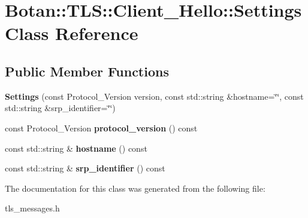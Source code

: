 \hypertarget{class_botan_1_1_t_l_s_1_1_client___hello_1_1_settings}{}\section{Botan\+:\+:T\+LS\+:\+:Client\+\_\+\+Hello\+:\+:Settings Class Reference}
\label{class_botan_1_1_t_l_s_1_1_client___hello_1_1_settings}
\subsection*{Public Member Functions}
\begin{DoxyCompactItemize}
\item 
\mbox{\label{class_botan_1_1_t_l_s_1_1_client___hello_1_1_settings_a61bdfb25a92edd0d0a24cb6f07dc519c}} 
{\bfseries Settings} (const Protocol\+\_\+\+Version version, const std\+::string \&hostname=\char`\"{}\char`\"{}, const std\+::string \&srp\+\_\+identifier=\char`\"{}\char`\"{})
\item 
\mbox{\label{class_botan_1_1_t_l_s_1_1_client___hello_1_1_settings_a832473d40546c2285cedcc82e014e822}} 
const Protocol\+\_\+\+Version {\bfseries protocol\+\_\+version} () const
\item 
\mbox{\label{class_botan_1_1_t_l_s_1_1_client___hello_1_1_settings_a6925918be4aed0beb65b681a246445d2}} 
const std\+::string \& {\bfseries hostname} () const
\item 
\mbox{\label{class_botan_1_1_t_l_s_1_1_client___hello_1_1_settings_a98c90321ba8f044adf9f321364fa6165}} 
const std\+::string \& {\bfseries srp\+\_\+identifier} () const
\end{DoxyCompactItemize}


The documentation for this class was generated from the following file\+:\begin{DoxyCompactItemize}
\item 
tls\+\_\+messages.\+h\end{DoxyCompactItemize}
